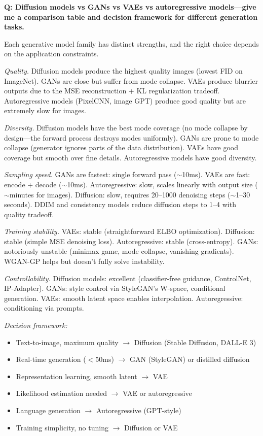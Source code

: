 \begin{interviewq}
\textbf{Q: Diffusion models vs GANs vs VAEs vs autoregressive models---give me a comparison table and decision framework for different generation tasks.}

 \quad {} \quad \badgefreq{\freqhigh}

\stronganswer Each generative model family has distinct strengths, and the right choice depends on the application constraints.

\textit{Quality.} Diffusion models produce the highest quality images (lowest FID on ImageNet). GANs are close but suffer from mode collapse. VAEs produce blurrier outputs due to the MSE reconstruction + KL regularization tradeoff. Autoregressive models (PixelCNN, image GPT) produce good quality but are extremely slow for images.

\textit{Diversity.} Diffusion models have the best mode coverage (no mode collapse by design---the forward process destroys modes uniformly). GANs are prone to mode collapse (generator ignores parts of the data distribution). VAEs have good coverage but smooth over fine details. Autoregressive models have good diversity.

\textit{Sampling speed.} GANs are fastest: single forward pass ($\sim$10ms). VAEs are fast: encode + decode ($\sim$10ms). Autoregressive: slow, scales linearly with output size ($\sim$minutes for images). Diffusion: slow, requires 20--1000 denoising steps ($\sim$1--30 seconds). DDIM and consistency models reduce diffusion steps to 1--4 with quality tradeoff.

\textit{Training stability.} VAEs: stable (straightforward ELBO optimization). Diffusion: stable (simple MSE denoising loss). Autoregressive: stable (cross-entropy). GANs: notoriously unstable (minimax game, mode collapse, vanishing gradients). WGAN-GP helps but doesn't fully solve instability.

\textit{Controllability.} Diffusion models: excellent (classifier-free guidance, ControlNet, IP-Adapter). GANs: style control via StyleGAN's W-space, conditional generation. VAEs: smooth latent space enables interpolation. Autoregressive: conditioning via prompts.

\textit{Decision framework:}
\begin{itemize}
    \item Text-to-image, maximum quality $\to$ Diffusion (Stable Diffusion, DALL-E 3)
    \item Real-time generation ($<$50ms) $\to$ GAN (StyleGAN) or distilled diffusion
    \item Representation learning, smooth latent $\to$ VAE
    \item Likelihood estimation needed $\to$ VAE or autoregressive
    \item Language generation $\to$ Autoregressive (GPT-style)
    \item Training simplicity, no tuning $\to$ Diffusion or VAE
\end{itemize}


\end{interviewq}
